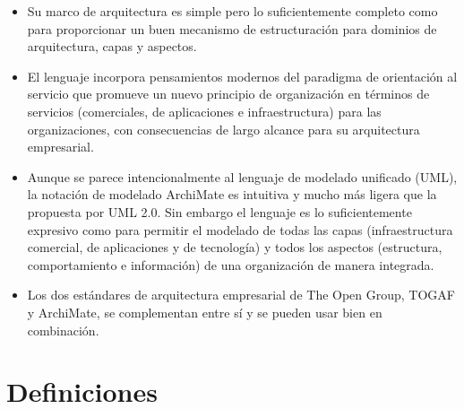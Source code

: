 \begin{itemize}
\item Su marco de arquitectura es simple pero lo suficientemente completo como para proporcionar un buen mecanismo de estructuración para dominios de arquitectura, capas y aspectos.

\item El lenguaje incorpora pensamientos modernos del paradigma de orientación al servicio que promueve un nuevo principio de organización en términos de servicios (comerciales, de aplicaciones e infraestructura) para las organizaciones, con consecuencias de largo alcance para su arquitectura empresarial.

\item Aunque se parece intencionalmente al lenguaje de modelado unificado (UML), la notación de modelado ArchiMate es intuitiva y mucho más ligera que la propuesta por UML 2.0. Sin embargo el lenguaje es lo suficientemente expresivo como para permitir el modelado de todas las capas (infraestructura comercial, de aplicaciones y de tecnología) y todos los aspectos (estructura, comportamiento e información) de una organización de manera integrada.

\item Los dos estándares de arquitectura empresarial de The Open Group, TOGAF y ArchiMate, se complementan entre sí y se pueden usar bien en combinación\cite{ArchiMate2.0}.
\end{itemize}
\newpage

\section{Definiciones}

